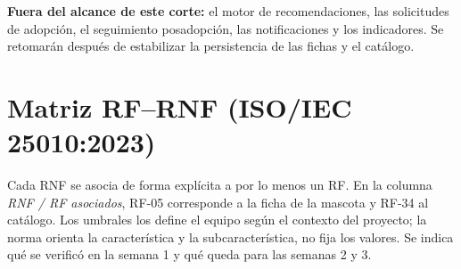 \documentclass[11pt,a4paper]{article}
\begin{document}
{\footnotesize
\textbf{Fuera del alcance de este corte:} el motor de recomendaciones, las solicitudes
de adopción, el seguimiento posadopción, las notificaciones y los indicadores. Se retomarán
después de estabilizar la persistencia de las fichas y el catálogo.\par}

\clearpage

\section{Matriz RF--RNF (ISO/IEC 25010:2023)}

{\footnotesize
Cada RNF se asocia de forma explícita a por lo menos un RF. En la columna
\emph{RNF / RF asociados}, RF-05 corresponde a la ficha de la mascota y RF-34 al catálogo.
Los umbrales los define el equipo según el contexto del proyecto; la norma orienta la
característica y la subcaracterística, no fija los valores. Se indica qué se verificó en la
semana 1 y qué queda para las semanas 2 y 3.\par}
\end{document}

